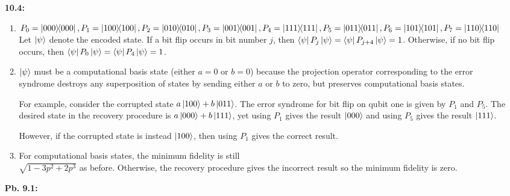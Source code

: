 \documentclass[a4paper,12pt]{article}
\begin{document}
\begin{enumerate}
    \item[\textbf{10.4:}]
        \begin{enumerate}[label = (\arabic*)]
            \item
                $P_0 = \dyad{000}{000}, P_1 = \dyad{100}{100}, P_2 = \dyad{010}{010}, P_3 = \dyad{001}{001}, \\
                P_4 = \dyad{111}{111}, P_5 = \dyad{011}{011}, P_6 = \dyad{101}{101}, P_7 = \dyad{110}{110}$ \\
                Let $\ket{\psi}$ denote the encoded state. If a bit flip occurs in bit number $j$, then $\bra{\psi} P_j \ket{\psi} = \bra{\psi} P_{j + 4} \ket{\psi} = 1$. Otherwise, if no bit flip occurs, then $\bra{\psi} P_0 \ket{\psi} = \bra{\psi} P_4 \ket{\psi} = 1$.

            \item
                $\ket{\psi}$ must be a computational basis state (either $a = 0$ or $b = 0$) because the projection operator corresponding to the error syndrome destroys any superposition of states by sending either $a$ or $b$ to zero, but preserves computational basis states. \par
                For example, consider the corrupted state $a\ket{100} + b\ket{011}$. The error syndrome for bit flip on qubit one is given by $P_1$ and $P_5$. The desired state in the recovery procedure is $a\ket{000} + b\ket{111}$, yet using $P_1$ gives the result $\ket{000}$ and using $P_5$ gives the result $\ket{111}$. \par
                However, if the corrupted state is instead $\ket{100}$, then using $P_1$ gives the correct result.

            \item
                For computational basis states, the minimum fidelity is still \\
                $\sqrt{1 - 3p^2 + 2p^3}$ as before. Otherwise, the recovery procedure gives the incorrect result so the minimum fidelity is zero.
        \end{enumerate}

    \item[\textbf{Pb. 9.1:}]

\end{enumerate}
\end{document}
